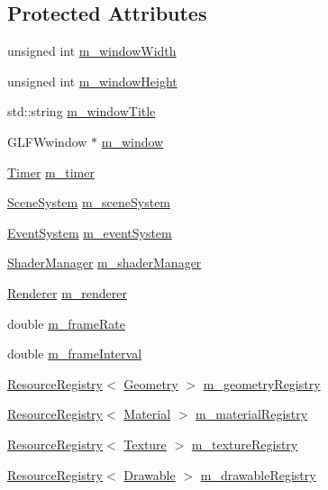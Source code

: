 \subsection*{Protected Attributes}
\begin{DoxyCompactItemize}
\item 
unsigned int \mbox{\hyperlink{classec_1_1_window_a123952ed65bb1099068dd7ca2781bd4b}{m\+\_\+window\+Width}}
\item 
unsigned int \mbox{\hyperlink{classec_1_1_window_a1beba0a39ddf045ba3ec441b2147a874}{m\+\_\+window\+Height}}
\item 
std\+::string \mbox{\hyperlink{classec_1_1_window_a2f9c3a96c57440be25c92fc09e8913d2}{m\+\_\+window\+Title}}
\item 
G\+L\+F\+Wwindow $\ast$ \mbox{\hyperlink{classec_1_1_window_a6d40786a23714fff2de92ed74e8eb10e}{m\+\_\+window}}
\item 
\mbox{\hyperlink{classec_1_1_timer}{Timer}} \mbox{\hyperlink{classec_1_1_window_af826de73c15768bf1a4ee5dbff0e377c}{m\+\_\+timer}}
\item 
\mbox{\hyperlink{classec_1_1_scene_system}{Scene\+System}} \mbox{\hyperlink{classec_1_1_window_a5c50dfac91e6105a6862693e71976a3e}{m\+\_\+scene\+System}}
\item 
\mbox{\hyperlink{classec_1_1_event_system}{Event\+System}} \mbox{\hyperlink{classec_1_1_window_afb083ee014fec3d0f141f24ce8c463a4}{m\+\_\+event\+System}}
\item 
\mbox{\hyperlink{classec_1_1_shader_manager}{Shader\+Manager}} \mbox{\hyperlink{classec_1_1_window_ad4b04fabdef20b69206562d2703a7bf9}{m\+\_\+shader\+Manager}}
\item 
\mbox{\hyperlink{classec_1_1_renderer}{Renderer}} \mbox{\hyperlink{classec_1_1_window_a6951a4d1a08549dcc797cf12c8f46710}{m\+\_\+renderer}}
\item 
double \mbox{\hyperlink{classec_1_1_window_aa7245d9cfc57373c805b63ba3e8826f8}{m\+\_\+frame\+Rate}}
\item 
double \mbox{\hyperlink{classec_1_1_window_a6c56361d6931e3a5a6dcfe7a08c25e09}{m\+\_\+frame\+Interval}}
\item 
\mbox{\hyperlink{classec_1_1_resource_registry}{Resource\+Registry}}$<$ \mbox{\hyperlink{classec_1_1_geometry}{Geometry}} $>$ \mbox{\hyperlink{classec_1_1_window_ac9bc9f64ecfe087b7423195c505120d7}{m\+\_\+geometry\+Registry}}
\item 
\mbox{\hyperlink{classec_1_1_resource_registry}{Resource\+Registry}}$<$ \mbox{\hyperlink{classec_1_1_material}{Material}} $>$ \mbox{\hyperlink{classec_1_1_window_a4b20defc21abe2eb397a09e389cad419}{m\+\_\+material\+Registry}}
\item 
\mbox{\hyperlink{classec_1_1_resource_registry}{Resource\+Registry}}$<$ \mbox{\hyperlink{classec_1_1_texture}{Texture}} $>$ \mbox{\hyperlink{classec_1_1_window_aeea5c28c3ae7ef5cf43472f506410abe}{m\+\_\+texture\+Registry}}
\item 
\mbox{\hyperlink{classec_1_1_resource_registry}{Resource\+Registry}}$<$ \mbox{\hyperlink{classec_1_1_drawable}{Drawable}} $>$ \mbox{\hyperlink{classec_1_1_window_a1c72dfdc44a79fe7d70456258db7064c}{m\+\_\+drawable\+Registry}}
\end{DoxyCompactItemize}


